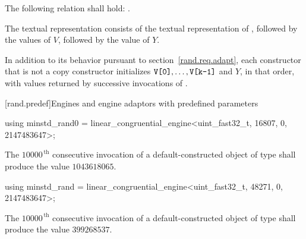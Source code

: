 \pnum
The following relation shall hold:
  .

\pnum
The textual representation%
%
consists of
 the textual representation of ,
followed by
 the  values of $V$,
followed by
 the value of $Y$.

\pnum
In addition to its behavior
pursuant to section~\ref{rand.req.adapt},
each constructor%
that is not a copy constructor
initializes $\texttt{V[0]}, \ldots, \texttt{V[k-1]}$ and $Y$,
in that order,
with values returned by successive invocations of .%




[rand.predef]{Engines and engine adaptors with predefined parameters}%
%
%

%
%
\begin{itemdecl}
using minstd_rand0 =
      linear_congruential_engine<uint_fast32_t, 16807, 0, 2147483647>;
\end{itemdecl}

\begin{itemdescr}
\pnum\required
 The $10000^{\,\mathrm{th}}$ consecutive invocation
 of a default-constructed object
 of type 
 shall produce the value $1043618065$.
\end{itemdescr}

%
%
\begin{itemdecl}
using minstd_rand =
      linear_congruential_engine<uint_fast32_t, 48271, 0, 2147483647>;
\end{itemdecl}

\begin{itemdescr}
\pnum\required
 The $10000^{\,\mathrm{th}}$ consecutive invocation
 of a default-constructed object
 of type 
 shall produce the value $399268537$.
\end{itemdescr}

